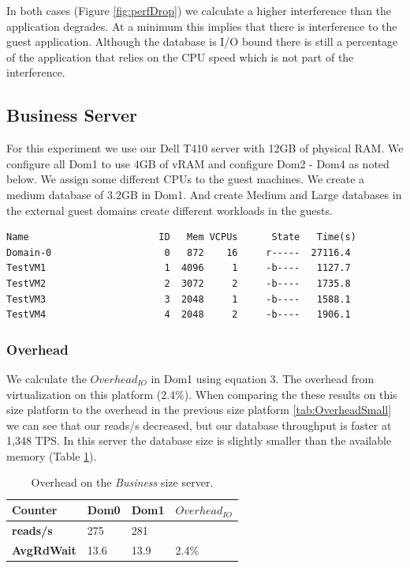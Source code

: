 In both cases (Figure \ref{fig:perfDrop}) we calculate a higher interference than the application degrades.  At a minimum this implies that there is interference to the guest application.  Although the database is I/O bound there is still a percentage of the application that relies on the CPU speed which is not part of the interference.  

\subsection{Business Server}
For this experiment we use our Dell T410 server with 12GB of physical RAM. We configure all Dom1 to use 4GB of vRAM and configure Dom2 - Dom4 as noted below.  We assign some different CPUs to the guest machines. We create a medium database of 3.2GB in Dom1.   And create Medium and Large databases in the external guest domains create different workloads in the guests.

\begin{Verbatim}
Name                       ID   Mem VCPUs      State   Time(s)
Domain-0                    0   872    16     r-----  27116.4
TestVM1                     1  4096     1     -b----   1127.7
TestVM2                     2  3072     2     -b----   1735.8
TestVM3                     3  2048     1     -b----   1588.1
TestVM4                     4  2048     2     -b----   1906.1
\end{Verbatim}

\subsubsection{Overhead}
We calculate the $Overhead_{IO}$ in Dom1 using equation 3.  The overhead from virtualization on this platform (2.4\%).   When comparing the these results on this size platform to the overhead in the previous size platform \ref{tab:OverheadSmall} we can see that our reads/s  decreased, but our database throughput is faster at 1,348 TPS.  In this server the database size is slightly smaller than the available memory (Table \ref{tab:OverheadDell}).

\begin{table}[h]
\begin{tabular}{ l l l p{5cm} }
  Counter     & Dom0 & Dom1 & $Overhead_{IO}$ \\
  \hline
    \textbf{reads/s}    & 275  & 281 & \\
    \textbf{AvgRdWait}  & 13.6 & 13.9 & 2.4\% \\ 
  \hline
\end{tabular}
\caption{Overhead on the \emph{Business} size server.}
\label{tab:OverheadDell}
\end{table}

